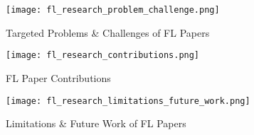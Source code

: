 \begin{figure}[p]
    \centering
    \texttt{[image: fl\_research\_problem\_challenge.png]}
    \caption{Targeted Problems \& Challenges of FL Papers}
    \label{fig:fl_research_problem_challenge}

    \texttt{[image: fl\_research\_contributions.png]}
    \caption{FL Paper Contributions}
    \label{fig:fl_research_contributions}
\end{figure}
\begin{figure}[h]
    \centering
    \texttt{[image: fl\_research\_limitations\_future\_work.png]}
    \caption{Limitations \& Future Work of FL Papers}
    \label{fig:fl_research_limitations_future_work}
\end{figure}
